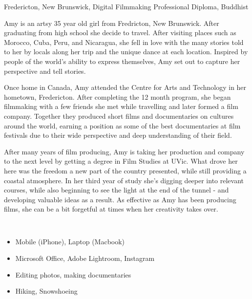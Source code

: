 \documentclass{article}
\begin{document}
\begin{description}[leftmargin=\parindent,labelindent=\parindent]
    \item[Demographics] Fredericton, New Brunswick, Digital Filmmaking Professional Diploma, Buddhist

    \item[Background] Amy is an artsy 35 year old girl from Fredricton, New Brunswick. After graduating from high school she decide to travel. After visiting places such as Morocco, Cuba, Peru, and Nicaragua, she fell in love with the many stories told to her by locals along her trip and the unique dance at each location. Inspired by people of the world's ability to express themselves, Amy set out to capture her perspective and tell stories.  

    Once home in Canada, Amy attended the Centre for Arts and Technology in her hometown, Fredericton. After completing the 12 month program, she began filmmaking with a few friends she met while travelling and later formed a film company. Together they produced short films  and documentaries on cultures around the world, earning a position as some of the best documentaries at film festivals due to their wide perspective and deep understanding of their field.
    
    After many years of film producing, Amy is taking her production and company to the next level by getting a degree in Film Studies at UVic. What drove her here was the freedom a new part of the country presented, while still providing a coastal atmosphere. In her third year of study she's digging deeper into relevant courses, while also beginning to see the light at the end of the tunnel - and developing valuable ideas as a result. As effective as Amy has been producing films, she can be a bit forgetful at times when her creativity takes over. 
    
    \item[Habits]~\\
    
    \begin{itemize}
        \item Mobile (iPhone), Laptop (Macbook)
\item Microsoft Office, Adobe Lightroom, Instagram 
\item Editing photos, making documentaries
\item Hiking, Snowshoeing
    \end{itemize}

\end{description}
\end{document}
